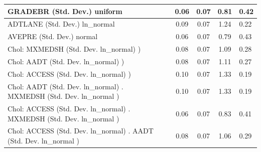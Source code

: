 \begin{table}
\begin{center}
\begin{tabular}{|l|l|c|c|c|l|}
			\hline
			GRADEBR (Std. Dev.) uniform &  & 0.06 & 0.07 & 0.81 & 0.42 \\
			\hline
			ADTLANE (Std. Dev.) ln_normal &  & 0.09 & 0.07 & 1.24 & 0.22 \\
			\hline
			AVEPRE (Std. Dev.) normal &  & 0.06 & 0.07 & 0.79 & 0.43 \\
			\hline
			 Chol: MXMEDSH (Std. Dev. ln_normal) ) &  & 0.08 & 0.07 & 1.09 & 0.28 \\
			\hline
			 Chol: AADT (Std. Dev. ln_normal) ) &  & 0.08 & 0.07 & 1.11 & 0.27 \\
			\hline
			 Chol: ACCESS (Std. Dev. ln_normal) ) &  & 0.10 & 0.07 & 1.33 & 0.19 \\
			\hline
			 Chol: AADT (Std. Dev. ln_normal) . MXMEDSH (Std. Dev.   ln_normal ) &  & 0.10 & 0.07 & 1.33 & 0.19 \\
			\hline
			 Chol: ACCESS (Std. Dev. ln_normal) . MXMEDSH (Std. Dev.   ln_normal ) &  & 0.06 & 0.07 & 0.83 & 0.41 \\
			\hline
			 Chol: ACCESS (Std. Dev. ln_normal) . AADT (Std. Dev.   ln_normal ) &  & 0.08 & 0.07 & 1.06 & 0.29 \\
			\hline
		\end{tabular}
	\end{center}
\end{table}